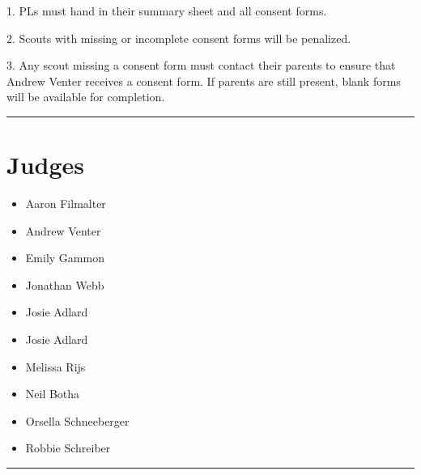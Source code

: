 \documentclass[10pt]{article}
\begin{document}
1. PLs must hand in their summary sheet and all consent forms.

2. Scouts with missing or incomplete consent forms will be penalized.

3. Any scout missing a consent form must contact their parents to ensure that Andrew Venter receives a consent form. If parents are still present, blank forms will be available for completion.


\vspace{0.5cm}
	\hrule
	\vspace{0.5cm}
		\section*{\faUsers \: Judges}

		

	\begin{multicols}{2}

		\begin{itemize}
									\item Aaron Filmalter
									\item Andrew Venter
									\item Emily Gammon
									\item Jonathan Webb
									\item Josie Adlard
						\end{itemize}

		\vfill\null
		\columnbreak

		\begin{itemize}
									\item Josie Adlard
									\item Melissa Rijs
									\item Neil Botha
									\item Orsella Schneeberger
									\item Robbie Schreiber
						\end{itemize}

		\vfill\null

		\end{multicols}



			\vspace{0.5cm}
	\hrule
	\vspace{0.5cm}
\end{document}
